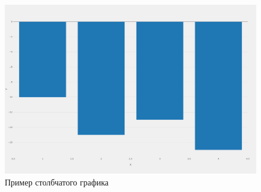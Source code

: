 \begin{figure}[h!]
    \center
    \includegraphics[scale=0.3]{fig/newplot (7).png}
    \caption{Пример столбчатого графика}
    \label{fig:16}
\end{figure}

